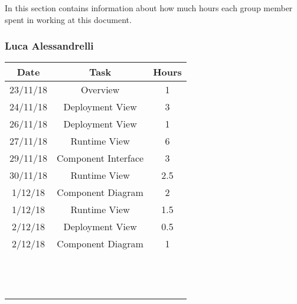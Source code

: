 In this section contains information about how much hours each group member spent in working at this document.
\bigbreak

\subsubsection{Luca Alessandrelli}
\begin{table}[h]
\centering
\begin{tabular}{|c|c|c|}
\hline
\rowcolor[HTML]{FE996B} 
Date & Task & Hours 
\\ \hline
\rowcolor[HTML]{FFFC9E} 
23/11/18  & Overview & 1  
\\ \hline
\rowcolor[HTML]{FFFC9E} 
24/11/18 & Deployment View & 3  
\\ \hline
\rowcolor[HTML]{FFFC9E}
26/11/18 & Deployment View & 1 
\\ \hline
\rowcolor[HTML]{FFFC9E}
27/11/18 & Runtime View & 6 
\\ \hline
\rowcolor[HTML]{FFFC9E}
29/11/18 & Component Interface & 3
\\ \hline
\rowcolor[HTML]{FFFC9E}
30/11/18 & Runtime View & 2.5
\\ \hline
\rowcolor[HTML]{FFFC9E}
1/12/18 & Component Diagram & 2 
\\ \hline
\rowcolor[HTML]{FFFC9E}
1/12/18 & Runtime View & 1.5
\\ \hline
\rowcolor[HTML]{FFFC9E}
2/12/18 & Deployment View & 0.5
\\ \hline
\rowcolor[HTML]{FFFC9E}
2/12/18 & Component Diagram & 1 
\\ \hline
\rowcolor[HTML]{FFFC9E}
 & & 
\\ \hline
\rowcolor[HTML]{FFFC9E}
 & & 
\\ \hline
\rowcolor[HTML]{FFFC9E}
 & & 
\\ \hline
\rowcolor[HTML]{FFFC9E}
 & & 
\\ \hline
\rowcolor[HTML]{FFFC9E}
 & & 
\\ \hline
\rowcolor[HTML]{FFFC9E}
 & & 
\\ \hline
\rowcolor[HTML]{FFFC9E}
 & & 
\\ \hline
\rowcolor[HTML]{FFFC9E}
 & & 
\\ \hline
\rowcolor[HTML]{FFFC9E}
 & & 
\\ \hline
\rowcolor[HTML]{FFFC9E}
 & & 
\\ \hline
\rowcolor[HTML]{FFFC9E}
 & & 
\\ \hline
\rowcolor[HTML]{FFFC9E}
 & & 
\\ \hline
\rowcolor[HTML]{FFFC9E}
 & & 
\\ \hline


\end{tabular}
\end{table}
